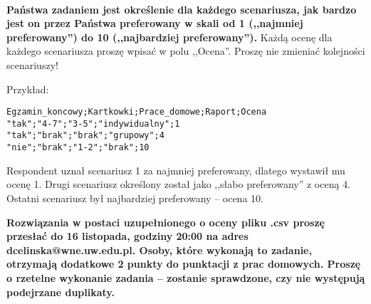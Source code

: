 \documentclass[12pt]{article}
\begin{document}
\vspace{0.5cm}\\
\noindent \textbf{Państwa zadaniem jest określenie dla każdego scenariusza, jak bardzo jest on przez Państwa preferowany w skali od 1 (,,najmniej preferowany'') do 10 (,,najbardziej preferowany'').} Każdą ocenę dla każdego scenariusza proszę wpisać w polu ,,Ocena''. Proszę nie zmieniać kolejności scenariuszy!
\newpage

\noindent Przykład:
\begin{verbatim}
Egzamin_koncowy;Kartkowki;Prace_domowe;Raport;Ocena
"tak";"4-7";"3-5";"indywidualny";1
"tak";"brak";"brak";"grupowy";4
"nie";"brak";"1-2";"brak";10
\end{verbatim}

\noindent Respondent uznał scenariusz 1 za najmniej preferowany, dlatego wystawił mu ocenę 1. Drugi scenariusz określony został jako ,,słabo preferowany'' z oceną 4. Ostatni scenariusz był najbardziej preferowany -- ocena 10.

\vspace{0.5cm}

\noindent \textbf{Rozwiązania w postaci uzupełnionego o oceny pliku .csv proszę przesłać do 16 listopada, godziny 20:00 na adres dcelinska@wne.uw.edu.pl. Osoby, które wykonają to zadanie, otrzymają dodatkowe 2 punkty do punktacji z prac domowych. Proszę o rzetelne wykonanie zadania -- zostanie sprawdzone, czy nie występują podejrzane duplikaty.}
\end{document}

